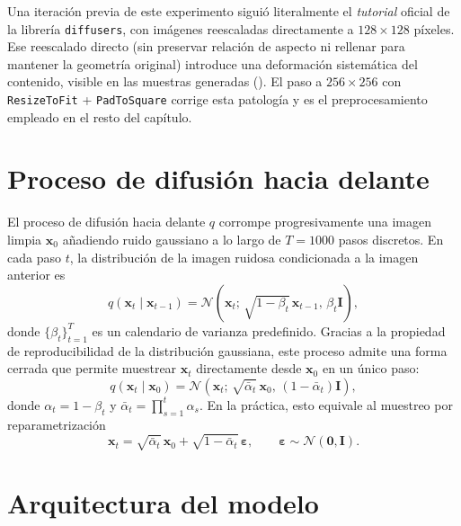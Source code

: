 Una iteración previa de este experimento siguió literalmente el
\textit{tutorial} oficial de la librería \texttt{diffusers}, con
imágenes reescaladas directamente a $128 \times 128$ píxeles. Ese
reescalado directo (sin preservar relación de aspecto ni rellenar
para mantener la geometría original) introduce una deformación
sistemática del contenido, visible en las muestras generadas
(). El paso a $256 \times 256$ con
\texttt{ResizeToFit} + \texttt{PadToSquare} corrige esta patología
y es el preprocesamiento empleado en el resto del capítulo.

\section{Proceso de difusión hacia delante}
\label{sec:mariposas-forward}

El proceso de difusión hacia delante $q$ corrompe progresivamente
una imagen limpia $\mathbf{x}_0$ añadiendo ruido gaussiano a lo
largo de $T = 1000$ pasos discretos. En cada paso $t$, la
distribución de la imagen ruidosa condicionada a la imagen
anterior es
\begin{equation}
    q(\mathbf{x}_t \mid \mathbf{x}_{t-1})
    = \mathcal{N}\!\left(\mathbf{x}_t;\, \sqrt{1 - \beta_t}\,
      \mathbf{x}_{t-1},\, \beta_t \mathbf{I}\right),
\end{equation}
donde $\{\beta_t\}_{t=1}^{T}$ es un calendario de varianza
predefinido. Gracias a la propiedad de reproducibilidad de la
distribución gaussiana, este proceso admite una forma cerrada
que permite muestrear $\mathbf{x}_t$ directamente desde
$\mathbf{x}_0$ en un único paso:
\begin{equation}
    q(\mathbf{x}_t \mid \mathbf{x}_0)
    = \mathcal{N}\!\left(\mathbf{x}_t;\, \sqrt{\bar{\alpha}_t}\,
      \mathbf{x}_0,\, (1 - \bar{\alpha}_t)\mathbf{I}\right),
\end{equation}
donde $\alpha_t = 1 - \beta_t$ y $\bar{\alpha}_t = \prod_{s=1}^{t}
\alpha_s$. En la práctica, esto equivale al muestreo por
reparametrización
\begin{equation}
    \mathbf{x}_t
    = \sqrt{\bar{\alpha}_t}\,\mathbf{x}_0
    + \sqrt{1 - \bar{\alpha}_t}\,\boldsymbol{\varepsilon},
    \qquad
    \boldsymbol{\varepsilon} \sim \mathcal{N}(\mathbf{0}, \mathbf{I}).
\end{equation}

\section{Arquitectura del modelo}
\label{sec:mariposas-arquitectura}

